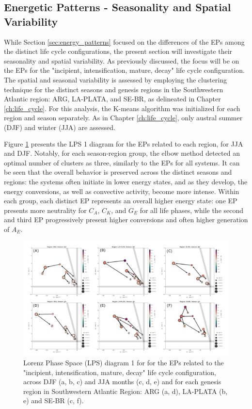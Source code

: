 \subsection{Energetic Patterns - Seasonality and Spatial Variability}\label{sec:energy_patterns_season_region}

While Section \ref{sec:energy_patterns} focused on the differences of the EPs among the distinct life cycle configurations, the present section will investigate their seasonality and spatial variability. As previously discussed, the focus will be on the EPs for the "incipient, intensification, mature, decay" life cycle configuration. The spatial and seasonal variability is assessed by employing the clustering technique for the distinct seasons and genesis regions in the Southwestern Atlantic region: ARG, LA-PLATA, and SE-BR, as delineated in Chapter \ref{ch:life_cycle}. For this analysis, the K-means algorithm was initialized for each region and season separately. As in Chapter \ref{ch:life_cycle}, only austral summer (DJF) and winter (JJA) are assessed.

Figure \ref{fig:lps_mixed_clusters_IcItDM_seasons_regions} presents the LPS 1 diagram for the EPs related to each region, for JJA and DJF. Notably, for each season-region group, the elbow method detected an optimal number of clusters as three, similarly to the EPs for all systems. It can be seen that the overall behavior is preserved across the distinct seasons and regions: the systems often initiate in lower energy states, and as they develop, the energy conversions, as well as convective activity, become more intense. Within each group, each distinct EP represents an overall higher energy state: one EP presents more neutrality for $C_A$, $C_K$, and $G_E$ for all life phases, while the second and third EP progressively present higher conversions and often higher generation of $A_E$.


\begin{figure}[!htbp]
\centering
\includegraphics[width=\textwidth]{figs_6/lps_mixed_clusters_IcItDM_seasons_regions.pdf}
\caption[LPS 1 - Clusters - Seasonality and Spatial Variability]{Lorenz Phase Space (LPS) diagram 1 for for the EPs related to the "incipient, intensification, mature, decay" life cycle configuration, across DJF (a, b, c) and JJA months (c, d, e) and for each genesis region in Southwestern Atlantic Region: ARG (a, d), LA-PLATA (b, e) and SE-BR (c, f).}
\label{fig:lps_mixed_clusters_IcItDM_seasons_regions}
\end{figure}

